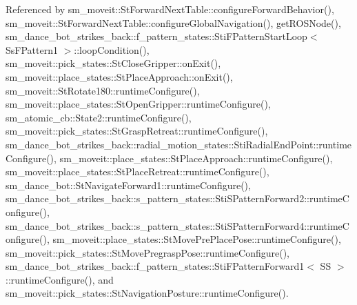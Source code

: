Referenced by sm\+\_\+moveit\+::\+St\+Forward\+Next\+Table\+::configure\+Forward\+Behavior(), sm\+\_\+moveit\+::\+St\+Forward\+Next\+Table\+::configure\+Global\+Navigation(), get\+R\+O\+S\+Node(), sm\+\_\+dance\+\_\+bot\+\_\+strikes\+\_\+back\+::f\+\_\+pattern\+\_\+states\+::\+Sti\+F\+Pattern\+Start\+Loop$<$ Ss\+F\+Pattern1 $>$\+::loop\+Condition(), sm\+\_\+moveit\+::pick\+\_\+states\+::\+St\+Close\+Gripper\+::on\+Exit(), sm\+\_\+moveit\+::place\+\_\+states\+::\+St\+Place\+Approach\+::on\+Exit(), sm\+\_\+moveit\+::\+St\+Rotate180\+::runtime\+Configure(), sm\+\_\+moveit\+::place\+\_\+states\+::\+St\+Open\+Gripper\+::runtime\+Configure(), sm\+\_\+atomic\+\_\+cb\+::\+State2\+::runtime\+Configure(), sm\+\_\+moveit\+::pick\+\_\+states\+::\+St\+Grasp\+Retreat\+::runtime\+Configure(), sm\+\_\+dance\+\_\+bot\+\_\+strikes\+\_\+back\+::radial\+\_\+motion\+\_\+states\+::\+Sti\+Radial\+End\+Point\+::runtime\+Configure(), sm\+\_\+moveit\+::place\+\_\+states\+::\+St\+Place\+Approach\+::runtime\+Configure(), sm\+\_\+moveit\+::place\+\_\+states\+::\+St\+Place\+Retreat\+::runtime\+Configure(), sm\+\_\+dance\+\_\+bot\+::\+St\+Navigate\+Forward1\+::runtime\+Configure(), sm\+\_\+dance\+\_\+bot\+\_\+strikes\+\_\+back\+::s\+\_\+pattern\+\_\+states\+::\+Sti\+S\+Pattern\+Forward2\+::runtime\+Configure(), sm\+\_\+dance\+\_\+bot\+\_\+strikes\+\_\+back\+::s\+\_\+pattern\+\_\+states\+::\+Sti\+S\+Pattern\+Forward4\+::runtime\+Configure(), sm\+\_\+moveit\+::place\+\_\+states\+::\+St\+Move\+Pre\+Place\+Pose\+::runtime\+Configure(), sm\+\_\+moveit\+::pick\+\_\+states\+::\+St\+Move\+Pregrasp\+Pose\+::runtime\+Configure(), sm\+\_\+dance\+\_\+bot\+\_\+strikes\+\_\+back\+::f\+\_\+pattern\+\_\+states\+::\+Sti\+F\+Pattern\+Forward1$<$ S\+S $>$\+::runtime\+Configure(), and sm\+\_\+moveit\+::pick\+\_\+states\+::\+St\+Navigation\+Posture\+::runtime\+Configure().


